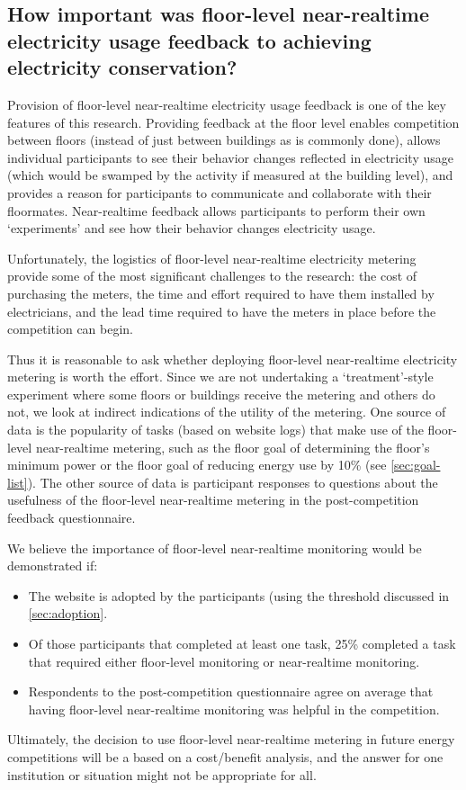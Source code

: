 \subsection[How important was floor-level near-realtime feedback?]{How important was floor-level near-realtime electricity usage feedback to achieving electricity conservation?}

Provision of floor-level near-realtime electricity usage feedback is one of the key features of this research. Providing feedback at the floor level enables competition between floors (instead of just between buildings as is commonly done), allows individual participants to see their behavior changes reflected in electricity usage (which would be swamped by the activity if measured at the building level), and provides a reason for participants to communicate and collaborate with their floormates. Near-realtime feedback allows participants to perform their own `experiments' and see how their behavior changes electricity usage.

Unfortunately, the logistics of floor-level near-realtime electricity metering provide some of the most significant challenges to the research: the cost of purchasing the meters, the time and effort required to have them installed by electricians, and the lead time required to have the meters in place before the competition can begin.


Thus it is reasonable to ask whether deploying floor-level near-realtime electricity metering is worth the effort. Since we are not undertaking a `treatment'-style experiment where some floors or buildings receive the metering and others do not, we look at indirect indications of the utility of the metering. One source of data is the popularity of tasks (based on website logs) that make use of the floor-level near-realtime metering, such as the floor goal of determining the floor's minimum power or the floor goal of reducing energy use by 10\% (see \autoref{sec:goal-list}). The other source of data is participant responses to questions about the usefulness of the floor-level near-realtime metering in the post-competition feedback questionnaire.

We believe the importance of floor-level near-realtime monitoring would be demonstrated if:

\begin{itemize}
	\item The website is adopted by the participants (using the threshold discussed in \autoref{sec:adoption}.
	\item Of those participants that completed at least one task, 25\% completed a task that required either floor-level monitoring or near-realtime monitoring.
	\item Respondents to the post-competition questionnaire agree on average that having floor-level near-realtime monitoring was helpful in the competition.
\end{itemize}

Ultimately, the decision to use floor-level near-realtime metering in future energy competitions will be a based on a cost/benefit analysis, and the answer for one institution or situation might not be appropriate for all.